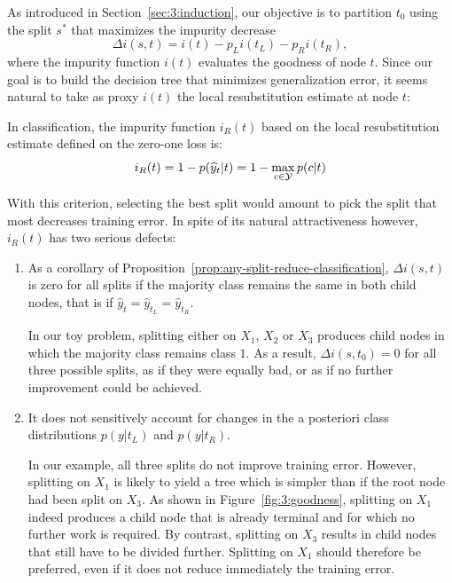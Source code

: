 As introduced in Section~\ref{sec:3:induction}, our objective is to partition
$t_0$ using the split $s^*$ that maximizes the impurity decrease $$\Delta i(s,
t) = i(t) - p_L i(t_L) - p_R i(t_R),$$ where the impurity function $i(t)$
evaluates the goodness of node $t$. Since our goal is to build the decision
tree that minimizes generalization error, it seems natural to take as proxy
$i(t)$ the local resubstitution estimate at node $t$:
\begin{definition}
In classification, the impurity function $i_R(t)$ based on the local resubstitution estimate
defined on the zero-one loss is:
\begin{equation}\label{eqn:impurity:error}
i_R(t) = 1 - p(\widehat{y}_t|t) =  1 - \max_{c \in {\cal Y}} p(c|t)
\end{equation}
\end{definition}
With this criterion, selecting the best split would amount to pick the split that most
decreases training error. In spite of its natural attractiveness however,
$i_R(t)$ has two serious defects:
\begin{enumerate}
\item As a corollary of Proposition~\ref{prop:any-split-reduce-classification},
      $\Delta i(s, t)$ is zero for all splits if the majority class remains
      the same in both child nodes, that is if $\widehat{y}_t = \widehat{y}_{t_L} = \widehat{y}_{t_R}$.

      In our toy problem, splitting either on $X_1$, $X_2$ or $X_3$ produces
      child nodes in which the majority class remains class $1$. As a result,
      $\Delta i(s, t_0) = 0$ for all three possible splits, as if they were
      equally bad, or as if no further improvement could be achieved.

\item It does not sensitively account for changes in the a posteriori class
      distributions $p(y|t_L)$ and $p(y|t_R)$.

      In our example, all three splits do not improve training error. However,
      splitting on $X_1$ is likely to yield a tree which is simpler than if the
      root node had been split on $X_3$.  As shown in
      Figure~\ref{fig:3:goodness}, splitting on $X_1$ indeed produces a child
      node that is already terminal and for which no further work is required.
      By contrast, splitting on $X_3$ results in child nodes that still have to be
      divided further.  Splitting on $X_1$ should therefore be preferred, even
      if it does not reduce immediately the training error.
\end{enumerate}

